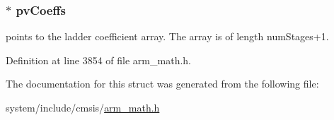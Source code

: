 \subsubsection[{\texorpdfstring{pv\+Coeffs}{pvCoeffs}}]{$\ast$ pv\+Coeffs}\hypertarget{structarm__iir__lattice__instance__q31_a3d7de56fe9de3458f033a64f14407533}{}\label{structarm__iir__lattice__instance__q31_a3d7de56fe9de3458f033a64f14407533}
points to the ladder coefficient array. The array is of length num\+Stages+1. 

Definition at line 3854 of file arm\+\_\+math.\+h.



The documentation for this struct was generated from the following file\+:\begin{DoxyCompactItemize}
\item 
system/include/cmsis/\hyperlink{arm__math_8h}{arm\+\_\+math.\+h}\end{DoxyCompactItemize}
